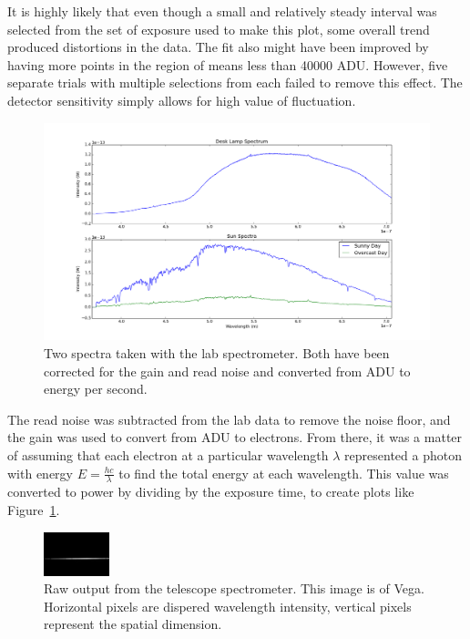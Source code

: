 \documentclass[a4paper,12pt]{article}
\begin{document}
It is highly likely that even though a small and relatively steady interval was selected from the set of exposure used to make this plot, some overall trend produced distortions in the data. The fit also might have been improved by having more points in the region of means less than 40000 ADU. However, five separate trials with multiple selections from each failed to remove this effect. The detector sensitivity simply allows for high value of fluctuation. 
\begin{figure}[!htbp]
\centering
\includegraphics[scale = 0.35]{lab_spec.png}
\caption{Two spectra taken with the lab spectrometer. Both have been corrected for the gain and read noise and converted from ADU to energy per second.}
\label{fig:labspec}
\end{figure}
The read noise was subtracted from the lab data to remove the noise floor, and the gain was used to convert from ADU to electrons. From there, it was a matter of assuming that each electron at a particular wavelength $\lambda$ represented a photon with energy $E=\frac{hc}{\lambda}$ to find the total energy at each wavelength. This value was converted to power by dividing by the exposure time, to create plots like Figure~\ref{fig:labspec}.

\begin{figure}[!htbp]
\centering
\includegraphics[width=\linewidth,height=0.5in]{vega.png}
\caption{Raw output from the telescope spectrometer. This image is of Vega. Horizontal pixels are dispered wavelength intensity, vertical pixels represent the spatial dimension.}
\label{fig:vega}
\end{figure}
\end{document}

